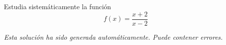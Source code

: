 \documentclass[nochap,palatino,nobuilddate]{estudioFuncion}
\newcommand{\newexample}[1]{
	\section{Análisis sistemático de una función}
	Analiza sistemáticamente la siguiente función:
	
	\begin{mdframed}
	\[f(x) = \sagestr{latex(f(x))}\]
	\end{mdframed}
	
	\newpage
}
\begin{document}
\begin{problem} Estudia sistemáticamente la función
	\[
		f(x)=\frac{x+2}{x-2}
	\]
\solution

\textit{Esta solución ha sido generada automáticamente. Puede contener errores.}


\end{problem}


%
%
%
%
%
%
%
%
%
%
%
%
\end{document}
